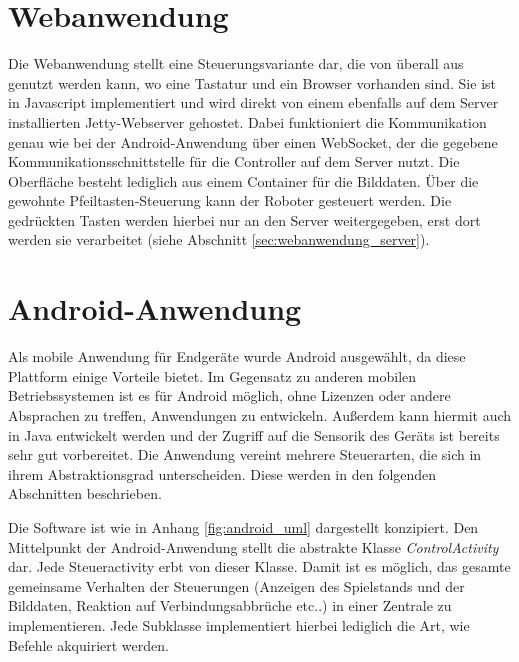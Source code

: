 \section{Webanwendung}
\label{sec:webanwendung_anwendung}

Die Webanwendung stellt eine Steuerungsvariante dar, die von überall aus genutzt werden kann, wo eine Tastatur und ein Browser vorhanden sind. Sie ist in Javascript implementiert und wird direkt von einem ebenfalls auf dem Server installierten Jetty-Webserver gehostet. Dabei funktioniert die Kommunikation genau wie bei der Android-Anwendung über einen WebSocket, der die gegebene Kommunikationsschnittstelle für die Controller auf dem Server nutzt. 
Die Oberfläche besteht lediglich aus einem Container für die Bilddaten. 
Über die gewohnte Pfeiltasten-Steuerung kann der Roboter gesteuert werden. Die gedrückten Tasten werden hierbei nur an den Server weitergegeben, erst dort werden sie verarbeitet (siehe Abschnitt \ref{sec:webanwendung_server}).

\section{Android-Anwendung}
Als mobile Anwendung für Endgeräte wurde Android ausgewählt, da diese Plattform einige Vorteile bietet. Im Gegensatz zu anderen mobilen Betriebssystemen ist es für Android möglich, ohne Lizenzen oder andere Absprachen zu treffen, Anwendungen zu entwickeln. Außerdem kann hiermit auch in Java entwickelt werden und der Zugriff auf die Sensorik des Geräts ist bereits sehr gut vorbereitet. 
Die Anwendung vereint mehrere Steuerarten, die sich in ihrem Abstraktionsgrad unterscheiden. Diese werden in den folgenden Abschnitten beschrieben.

Die Software ist wie in Anhang \ref{fig:android_uml} dargestellt konzipiert. Den Mittelpunkt der Android-Anwendung stellt die abstrakte Klasse \textit{ControlActivity} dar. Jede Steueractivity erbt von dieser Klasse. Damit ist es möglich, das gesamte gemeinsame Verhalten der Steuerungen (Anzeigen des Spielstands und der Bilddaten, Reaktion auf Verbindungsabbrüche etc..) in einer Zentrale zu implementieren. Jede Subklasse implementiert hierbei lediglich die Art, wie Befehle akquiriert werden. 

